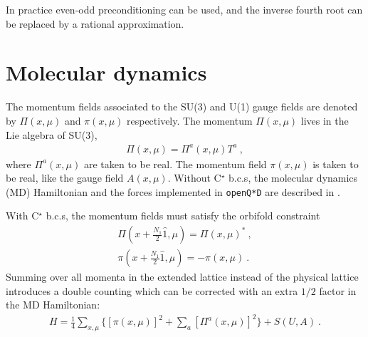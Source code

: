 \documentclass[11pt,fleqn]{article}
\begin{document}
In practice even-odd preconditioning can be used, and the inverse fourth root can be replaced by a rational approximation.



\section{Molecular dynamics}

The momentum fields associated to the SU(3) and U(1) gauge fields are denoted by $\Pi(x,\mu)$ and $\pi(x,\mu)$ respectively. The momentum $\Pi(x,\mu)$ lives in the Lie algebra of SU(3),
\begin{gather}
   \Pi(x,\mu) = \Pi^a(x,\mu) T^a \ ,
\end{gather}
where $\Pi^a(x,\mu)$ are taken to be real. The momentum field $\pi(x,\mu)$ is taken to be real, like the gauge field $A(x,\mu)$. Without C$^\star$ b.c.s, the molecular dynamics (MD) Hamiltonian and the forces implemented in \texttt{openQ*D} are described in \cite{rhmc}.

With C$^\star$ b.c.s, the momentum fields must satisfy the orbifold constraint
\begin{subequations}
   \label{eq:orbi:mom}
   \begin{gather}
      \Pi(x+\tfrac{N_1}{2} \hat{1},\mu) = \Pi(x,\mu)^* \ ,
      \label{eq:orbi:momSU3} \\
      \pi(x+\tfrac{N_1}{2} \hat{1},\mu) = -\pi(x,\mu) \ .
      \label{eq:orbi:momU1}
   \end{gather}
\end{subequations}
Summing over all momenta in the extended lattice instead of the physical lattice introduces a double counting which can be corrected with an extra $1/2$ factor in the MD Hamiltonian:
\begin{gather}
   H = \frac{1}{4} \sum_{x,\mu} \bigg\{ [\pi(x,\mu)]^2 + \sum_a [\Pi^a(x,\mu)]^2 \bigg\} + S(U,A) \ .
\end{gather}
\end{document}
